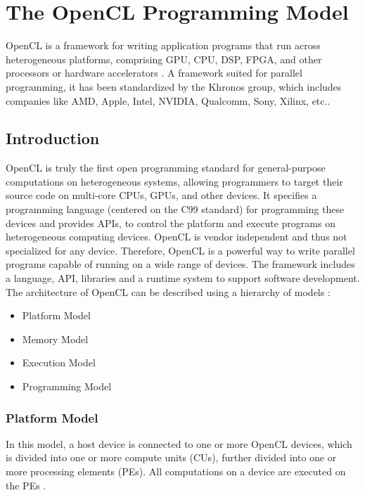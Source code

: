 \chapter{The OpenCL Programming Model}
\label{ch4_opencl}

OpenCL is a framework for writing application programs that run across heterogeneous platforms, comprising \ac{GPU}, \ac{CPU}, \ac{DSP}, \ac{FPGA}, and other processors or hardware accelerators \cite{opencl_wiki}. A framework suited for parallel programming, it has been standardized by the Khronos group, which includes companies like AMD, Apple, Intel, NVIDIA, Qualcomm, Sony, Xilinx, etc.\cite{opencl_fixstars}.

\section{Introduction}
\label{sect4_1}

OpenCL is truly the first open programming standard for general-purpose computations on heterogeneous systems, allowing programmers to target their source code on multi-core CPUs, GPUs, and other devices. It specifies a programming language (centered on the C99 standard) for programming these devices and provides \ac{API}s, to control the platform and execute programs on heterogeneous computing devices. OpenCL is vendor independent and thus not specialized for any device. Therefore, OpenCL is a powerful way to write parallel programs capable of running on a wide range of devices. \newline\newline
The framework includes a language, API, libraries and a runtime system to support software development. The architecture of OpenCL can be described using a hierarchy of models \cite{opencl_ajg}:

\begin{itemize}
\item Platform Model
\item Memory Model
\item Execution Model
\item Programming Model
\end{itemize}

\subsection{Platform Model}
\label{sect4_1_1}
In this model, a host device is connected to one or more OpenCL devices, which is divided into one or more compute units (CUs), further divided into one or more processing elements (PEs). All computations on a device are executed on the PEs \cite{opencl_khronos}.

